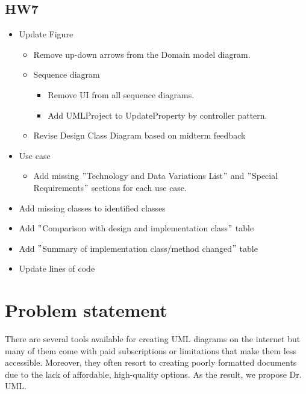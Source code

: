 \documentclass[12pt]{article}
\begin{document}
    \subsection{HW7}
    \begin{itemize}
        \item Update Figure
        \begin{itemize}
            \item Remove up-down arrows from the Domain model diagram.
            \item Sequence diagram
            \begin{itemize}
                \item Remove UI from all sequence diagrams.
                \item Add UMLProject to UpdateProperty by controller pattern.
            \end{itemize}
            \item Revise Design Class Diagram based on midterm feedback
        \end{itemize}
        \item Use case
        \begin{itemize}
            \item Add missing \("\)Technology and Data Variations List\("\) and \("\)Special Requirements\("\) sections for each use case.
        \end{itemize}
        \item Add missing classes to identified classes
        \item Add \("\)Comparison with design and implementation class\("\) table
        \item Add \("\)Summary of implementation class/method changed\("\) table
        \item Update lines of code
    \end{itemize}



    \section{Problem statement}


    There are several tools available for creating UML diagrams on the internet but many of them come with paid subscriptions or limitations that make them less accessible. Moreover, they often resort to creating poorly formatted documents due to the lack of affordable, high-quality options. As the result, we propose Dr. UML.\\
\end{document}

